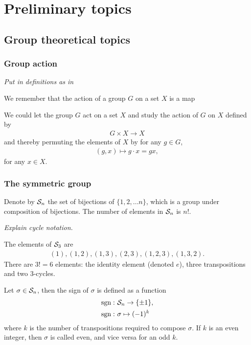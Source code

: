\clearpage{\thispagestyle{empty}}
\section{Preliminary topics}

\subsection{Group theoretical topics}

\subsubsection{Group action}

\textit{Put in definitions as in \cite{DummitFoote}}

We remember that the action of a group $G$ on a set $X$ is a map

We could let the group $G$ act on a set $X$ and study the action of $G$ on $X$ defined by
\begin{align*}
	G \times X \rightarrow X
\end{align*}
and thereby permuting the elements of $X$ by for any $g \in G$,
\begin{align*}
	(g,x) \mapsto g \cdot x = gx,
\end{align*}
for any $x \in X$.

\subsubsection{The symmetric group}

Denote by $\mathcal{S}_n$ the set of bijections of $\{1, 2, \dots n\}$, which is a group under composition of bijections. The number of elements in $\mathcal{S}_n$ is $n!$.

\textit{Explain cycle notation.}

\begin{example}
	The elements of $\mathcal{S}_3$ are
	\begin{align*}
		(1), (1,2), (1,3), (2,3), (1,2,3), (1,3,2).
	\end{align*}
	There are $3! = 6$ elements: the identity element (denoted $e$), three transpositions and two 3-cycles. 
\end{example}

\begin{definition}
	Let $\sigma \in \mathcal{S}_n$, then the sign of $\sigma$ is defined as a function
	\begin{align*}
		\text{sgn}: & \ \mathcal{S}_n \rightarrow \{\pm 1\},\\
		\text{sgn}: & \ \sigma \mapsto (-1)^k
	\end{align*}
	where $k$ is the number of transpositions required to compose $\sigma$. If $k$ is an even integer, then $\sigma$ is called even, and vice versa for an odd $k$.
\end{definition}


